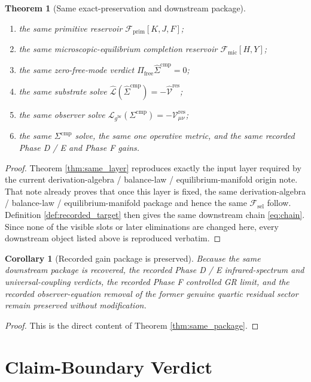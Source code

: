 \documentclass[11pt]{article}
\newcommand{\ObserverMetric}{g^{\mathrm{br}}}
\newcommand{\CompShift}{\Sigma^{\mathrm{cmp}}}
\newcommand{\CompLift}{\widehat\Sigma^{\mathrm{cmp}}}
\newcommand{\ResidualCore}{\mathcal V_{\mu\nu}^{\mathrm{res}}}
\newcommand{\ResidualLift}{\widehat{\mathcal V}^{\mathrm{res}}}
\newcommand{\SubReducedEin}{\widehat{\mathcal L}}
\newcommand{\FreeProj}{\Pi_{\mathrm{free}}}
\newcommand{\GaugeAux}{Y}
\newcommand{\ReducedEin}{\mathcal L_{\ObserverMetric}}
\newcommand{\MicFunctional}{\mathscr F_{\mathrm{mic}}}
\newcommand{\PrimFunctional}{\mathscr F_{\mathrm{prim}}}
\newcommand{\StemFunctional}{\mathscr F_{\mathrm{sel}}}
\newcommand{\PrimStrain}{K}
\newcommand{\PrimNeutral}{J}
\newcommand{\PrimFree}{F}
\newtheorem{corollary}{Corollary}
\newtheorem{theorem}{Theorem}
\begin{document}
\begin{theorem}[Same exact-preservation and downstream package]
\begin{enumerate}
    \item the same primitive reservoir \(\PrimFunctional[\PrimStrain,\PrimNeutral,\PrimFree]\);
    \item the same microscopic-equilibrium completion reservoir \(\MicFunctional[H,\GaugeAux]\);
    \item the same zero-free-mode verdict \(\FreeProj\CompLift=0\);
    \item the same substrate solve \(\SubReducedEin(\CompLift)=-\ResidualLift\);
    \item the same observer solve \(\ReducedEin(\CompShift)=-\ResidualCore\);
    \item the same \(\Sigma^{\mathrm{cmp}}\) solve, the same one operative metric, and the same recorded Phase D / E and Phase F gains.
\end{enumerate}
\end{theorem}

\begin{proof}
Theorem \ref{thm:same_layer} reproduces exactly the input layer required by the current derivation-algebra / balance-law / equilibrium-manifold origin note. That note already proves that once this layer is fixed, the same derivation-algebra / balance-law / equilibrium-manifold package and hence the same \(\StemFunctional\) follow. Definition \ref{def:recorded_target} then gives the same downstream chain \eqref{eq:chain}. Since none of the visible slots or later eliminations are changed here, every downstream object listed above is reproduced verbatim.
\end{proof}

\begin{corollary}[Recorded gain package is preserved]
\label{cor:gains}
Because the same downstream package is recovered, the recorded Phase D / E infrared-spectrum and universal-coupling verdicts, the recorded Phase F controlled GR limit, and the recorded observer-equation removal of the former genuine quartic residual sector remain preserved without modification.
\end{corollary}

\begin{proof}
This is the direct content of Theorem \ref{thm:same_package}.
\end{proof}

\section{Claim-Boundary Verdict}
\end{document}
